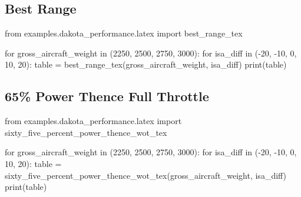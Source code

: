 \subsection{Best Range}

\begin{pycode}
from examples.dakota_performance.latex import best_range_tex

for gross_aircraft_weight in (2250, 2500, 2750, 3000):
    for isa_diff in (-20, -10, 0, 10, 20):
         table = best_range_tex(gross_aircraft_weight, isa_diff)
         print(table)
\end{pycode}

\subsection{65\% Power Thence Full Throttle}

\begin{pycode}
from examples.dakota_performance.latex import sixty_five_percent_power_thence_wot_tex

for gross_aircraft_weight in (2250, 2500, 2750, 3000):
    for isa_diff in (-20, -10, 0, 10, 20):
        table = sixty_five_percent_power_thence_wot_tex(gross_aircraft_weight, isa_diff)
        print(table)
\end{pycode}
